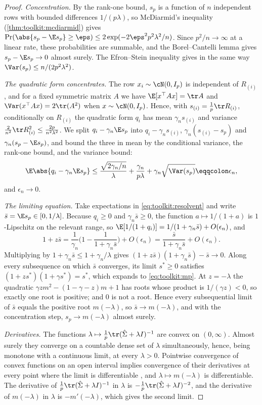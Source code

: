 \begin{refsection}
\begin{proof}
\emph{Concentration.} By the rank-one bound, $s_p$ is a function of $n$ independent rows with bounded differences $1/(p\lambda)$, so McDiarmid's inequality (\cref{thm:toolkit:mcdiarmid}) gives $\Pr(\abs{s_p-\E s_p}\ge\eps)\le2\exp(-2\eps^2p^2\lambda^2/n)$. Since $p^2/n\to\infty$ at a linear rate, these probabilities are summable, and the Borel--Cantelli lemma gives $s_p-\E s_p\to0$ almost surely. The Efron--Stein inequality \parencite[Theorem~3.1]{BoucheronLugosiMassart2013} gives in the same way $\Var(s_p)\le n/(2p^2\lambda^2)$.

\emph{The quadratic form concentrates.} The row $x_i\sim\cN(0,I_p)$ is independent of $R_{(i)}$, and for a fixed symmetric matrix $A$ we have $\E[x^\top Ax]=\tr A$ and $\Var(x^\top Ax)=2\tr(A^2)$ when $x\sim\cN(0,I_p)$. Hence, with $s_{(i)}=\frac1p\tr R_{(i)}$, conditionally on $R_{(i)}$ the quadratic form $q_i$ has mean $\gamma_ns_{(i)}$ and variance $\frac2{n^2}\tr R_{(i)}^2\le\frac{2p}{n^2\lambda^2}$. We split $q_i-\gamma_n\E s_p$ into $q_i-\gamma_ns_{(i)}$, $\gamma_n(s_{(i)}-s_p)$ and $\gamma_n(s_p-\E s_p)$, and bound the three in mean by the conditional variance, the rank-one bound, and the variance bound:
\[
  \E\abs{q_i-\gamma_n\E s_p}\le\frac{\sqrt{2\gamma_n/n}}{\lambda}+\frac{\gamma_n}{p\lambda}+\gamma_n\sqrt{\Var(s_p)}\eqqcolon\epsilon_n,
\]
and $\epsilon_n\to0$.

\emph{The limiting equation.} Take expectations in \eqref{eq:toolkit:resolvent} and write $\bar s=\E s_p\in[0,1/\lambda]$. Because $q_i\ge0$ and $\gamma_n\bar s\ge0$, the function $a\mapsto1/(1+a)$ is $1$-Lipschitz on the relevant range, so $\E[1/(1+q_i)]=1/(1+\gamma_n\bar s)+O(\epsilon_n)$, and
\[
  1+z\bar s=\frac1{\gamma_n}\Big(1-\frac1{1+\gamma_n\bar s}\Big)+O(\epsilon_n)=\frac{\bar s}{1+\gamma_n\bar s}+O(\epsilon_n).
\]
Multiplying by $1+\gamma_n\bar s\le1+\gamma_n/\lambda$ gives $(1+z\bar s)(1+\gamma_n\bar s)-\bar s\to0$. Along every subsequence on which $\bar s$ converges, its limit $s^*\ge0$ satisfies $(1+zs^*)(1+\gamma s^*)=s^*$, which expands to \eqref{eq:toolkit:mp}. At $z=-\lambda$ the quadratic $\gamma zm^2-(1-\gamma-z)m+1$ has roots whose product is $1/(\gamma z)<0$, so exactly one root is positive; and $0$ is not a root. Hence every subsequential limit of $\bar s$ equals the positive root $m(-\lambda)$, so $\bar s\to m(-\lambda)$, and with the concentration step, $s_p\to m(-\lambda)$ almost surely.

\emph{Derivatives.} The functions $\lambda\mapsto\frac1p\tr(\hat\Sigma+\lambda I)^{-1}$ are convex on $(0,\infty)$. Almost surely they converge on a countable dense set of $\lambda$ simultaneously, hence, being monotone with a continuous limit, at every $\lambda>0$. Pointwise convergence of convex functions on an open interval implies convergence of their derivatives at every point where the limit is differentiable \parencite[Theorem~24.5]{Rockafellar1970}, and $\lambda\mapsto m(-\lambda)$ is differentiable. The derivative of $\frac1p\tr(\hat\Sigma+\lambda I)^{-1}$ in $\lambda$ is $-\frac1p\tr(\hat\Sigma+\lambda I)^{-2}$, and the derivative of $m(-\lambda)$ in $\lambda$ is $-m'(-\lambda)$, which gives the second limit.


\end{proof}
\end{refsection}
